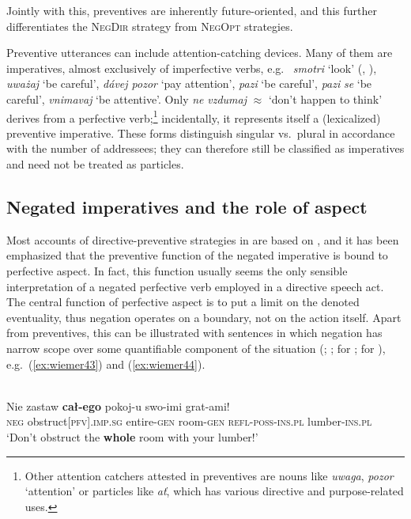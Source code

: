 \documentclass[output=paper,colorlinks,citecolor=brown]{langscibook}
\begin{document}
\noindent Jointly with this, preventives are inherently future-oriented, and this further differentiates the \textsc{NegDir} strategy from \textsc{NegOpt} strategies.

Preventive utterances can include attention-catching devices. Many of them are imperatives, almost exclusively of imperfective verbs, e.g.\  \textit{smotri} `look' (\citealt[153--154]{Volodin1986}, \citealt[215--216]{Xrakovskij1990}),  \textit{uważaj} `be careful',  \textit{dávej pozor} `pay attention',  \textit{pazi} `be careful',  \textit{pazi} \textit{se} `be careful', \textit{vnimavaj} `be attentive'. Only  \textit{ne} \textit{vzdumaj} ${\approx}$ `don't happen to think' derives from a perfective verb;\footnote{Other attention catchers attested in preventives are nouns like  \textit{uwaga},  \textit{pozor} `attention' or particles like  \textit{ať}, which has various directive and purpose-related uses.} incidentally, it represents itself a (lexicalized) preventive imperative. These forms distinguish singular vs.\ plural in accordance with the number of addressees; they can therefore still be classified as imperatives and need not be treated as particles.




\subsection{Negated imperatives and the role of aspect}
\label{subsec:negimp}

Most accounts of directive-preventive strategies in  are based on , and it has been emphasized that the preventive function of the negated imperative is bound to perfective aspect. In fact, this function usually seems the only sensible interpretation of a negated perfective verb employed in a directive speech act. The central function of perfective aspect is to put a limit on the denoted eventuality, thus negation operates on a boundary, not on the action itself. Apart from preventives, this can be illustrated with sentences in which negation has narrow scope over some quantifiable component of the situation (\citealt[104]{Holvoet1989}; \citealt[38]{Luczkow1997}; \citealt[18]{Laskowski1998} for ; \citealt[122]{Kučera1984} for ), e.g.\ (\ref{ex:wiemer43}) and (\ref{ex:wiemer44}).

\newpage
\ea \textnormal{} \\
\label{ex:wiemer43} 
\gll Nie zastaw \textbf{cał-ego} pokoj-u swo-imi grat-ami! \\
\textsc{neg} obstruct\textsc{[pfv].imp.sg} entire-\textsc{gen} room-\textsc{gen} \textsc{refl-poss-ins.pl} lumber-\textsc{ins.pl} \\
\glt `Don't obstruct the \textbf{whole} room with your lumber!'
\z
\end{document}
